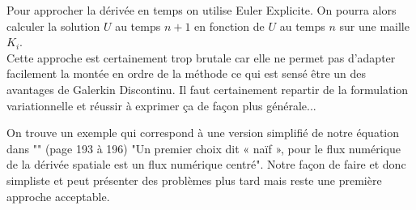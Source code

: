 Pour approcher la dérivée en temps on utilise Euler Explicite. On pourra alors calculer la solution $U$ au temps $n+1$ en fonction de $U$ au temps $n$ sur une maille $K_i$.\\
Cette approche est certainement trop brutale car elle ne permet pas d'adapter facilement la montée en ordre de la méthode ce qui est sensé être un des avantages de Galerkin Discontinu. Il faut certainement repartir de la formulation variationnelle et réussir à exprimer ça de façon plus générale...

On trouve un exemple qui correspond à une version simplifié de notre équation dans "\cite{Gerald2014}" (page 193 à 196)
"Un premier choix dit « naïf », pour le flux numérique de la dérivée spatiale est un flux numérique centré". Notre façon de faire et donc simpliste et peut présenter des problèmes plus tard mais reste une première approche acceptable.

















